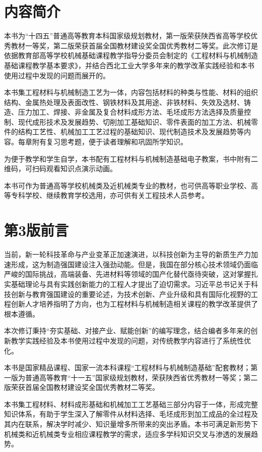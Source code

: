 \documentclass[UTF8]{ctexbook}
\newcommand{\◎}{\ensuremath{\bigcirc}}
\begin{document}
\section*{内容简介}

本书为“十四五”普通高等教育本科国家级规划教材，第一版荣获陕西省高等学校优秀教材一等奖，第二版荣获首届全国教材建设奖全国优秀教材二等奖。此次修订是依据教育部高等学校机械基础课程教学指导分委员会制定的《工程材料与机械制造基础课程教学基本要求》，并结合西北工业大学多年来的教学改革实践经验和本书使用过程中发现的问题而展开的。

本书集工程材料与机械制造工艺为一体，内容包括材料的种类与性能、材料的组织结构、金属热处理及表面改性、钢铁材料及其用途、非铁材料、失效及选材、铸造、压力加工、焊接、非金属及复合材料成形方法、毛坯成形方法选择及质量控制、现代成形技术及发展趋势、切削加工基础知识、零件表面的加工方法、机械零件的结构工艺性、机械加工工艺过程的基础知识、现代制造技术及发展趋势等内容。每章附有复习思考题，便于读者理解和巩固所学知识。

为便于教学和学生自学，本书配有工程材料与机械制造基础电子教案，书中附有二维码，可扫码观看知识点演示动画。

本书可作为普通高等学校机械类及近机械类专业的教材，也可供高等职业学校、高等专科学校、继续教育学校选用，亦可供有关工程技术人员参考。

\section*{第3版前言}

当前，新一轮科技革命与产业变革正加速演进，以科技创新为主导的新质生产力加速形成，这为制造强国建设注入强劲动能。但是，我国在部分核心技术领域仍面临严峻的国际挑战，高端装备、先进材料等领域的国产化替代亟待突破，这对掌握扎实基础理论与具有实践创新能力的工程人才提出了迫切需求。习近平总书记关于科技创新与教育强国建设的重要论述，为技术创新、产业升级和具有国际化视野的工程创新人才培养指明了方向，也为工程材料与机械制造相关课程的教学改革提供了根本遵循。

本次修订秉持“夯实基础、对接产业、赋能创新”的编写理念，结合编者多年来的创新教学实践经验及本书使用过程中发现的问题，对传统教学内容进行了系统性优化。

本书是国家精品课程、国家一流本科课程“工程材料与机械制造基础”配套教材；第一版为普通高等教育“十一五”国家级规划教材，荣获陕西省优秀教材一等奖；第二版荣获首届全国教材建设奖全国优秀教材二等奖。

本书集工程材料、材料成形基础和机械加工工艺基础三部分内容于一体，形成完整知识体系，有助于学生深入了解零件从材料选择、毛坯成形到加工成品的全过程及其内在联系，解决学时减少、知识量增多所带来的突出矛盾。本书可满足新形势下机械类和近机械类专业相应课程教学的需求，适应多学科知识交叉与渗透的发展趋势。
\end{document}
